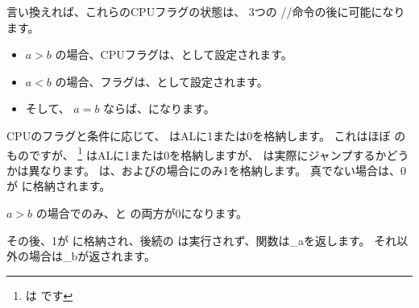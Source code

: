 言い換えれば、これらのCPUフラグの状態は、
3つの \FUCOMPP/\FNSTSW/\SAHF 命令の後に可能になります。

\begin{itemize}
\item $a>b$ の場合、CPUフラグは、として設定されます。
\item $a<b$ の場合、フラグは、として設定されます。
\item そして、 $a=b$ ならば、になります。
\end{itemize}


CPUのフラグと条件に応じて、 \SETNBE はALに1または0を格納します。 
これはほぼ \JNBE のものですが、 \SETcc
\footnote{ は  です}
はALに1または0を格納しますが、 \Jcc は実際にジャンプするかどうかは異なります。
\SETNBE は、およびの場合にのみ1を格納します。 
真でない場合は、0が \AL に格納されます。

$a>b$ の場合でのみ、\CF と \ZF の両方が0になります。

その後、1が \AL に格納され、後続の \JZ は実行されず、関数は{\_a}を返します。 
それ以外の場合は{\_b}が返されます。
